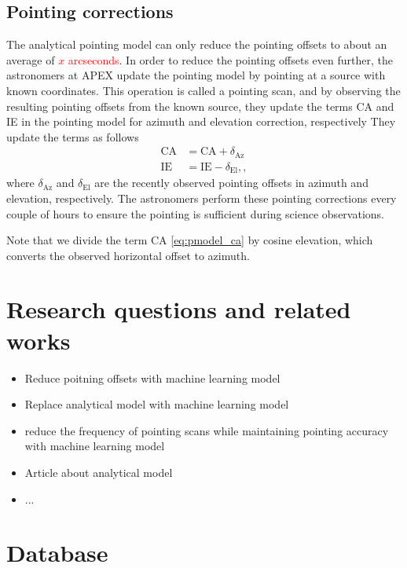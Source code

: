 \subsection{Pointing corrections} 
The analytical pointing model can only reduce the pointing offsets to about an average of \textcolor{red}{$x$ arcseconds}.
In order to reduce the pointing offsets even further, the astronomers at APEX update the pointing model by pointing at a source with known coordinates.
This operation is called a pointing scan, and by observing the resulting pointing offsets from the known source,
they update the terms CA and IE in the pointing model for azimuth and elevation correction, respectively
They update the terms as follows
\begin{align}
    \text{CA} &= \text{CA} + \delta_{\text{Az}} \label{eq:ca}\\ 
    \text{IE} &= \text{IE} - \delta_{\text{El}},\label{eq:ie},
\end{align}
where $\delta_{\text{Az}}$ and $\delta_{\text{El}}$ are the recently observed pointing offsets in azimuth and elevation, respectively.
The astronomers perform these pointing corrections every couple of hours to ensure the pointing is sufficient during science observations.

Note that we divide the term CA \eqref{eq:pmodel_ca} by cosine elevation, which converts the observed horizontal offset to azimuth.


\section{Research questions and related works} \label{sec:research_qs}
\begin{itemize}
    \item Reduce poitning offsets with machine learning model
    \item Replace analytical model with machine learning model
    \item reduce the frequency of pointing scans while maintaining pointing accuracy with machine learning model
\end{itemize}

\begin{itemize}
    \item Article about analytical model
    \item ...
\end{itemize}

\section{Database} \label{sec:database}


